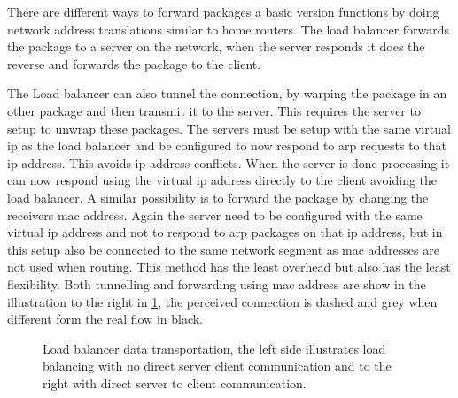 There are different ways to forward packages a basic version functions by doing network address translations similar to home routers.
The load balancer forwards the package to a server on the network, when the server responds it does the reverse and forwards the package to the client.

The Load balancer can also tunnel the connection, by warping the package in an other package and then transmit it to the server. This requires the server to setup to unwrap these packages. The servers must be setup with the same virtual ip as the load balancer and be configured to now respond to arp requests to that ip address. This avoids ip address conflicts. When the server is done processing it can now respond using the virtual ip address directly to the client avoiding the load balancer.
A similar possibility is to forward the package by changing the receivers mac address. Again the server need to be configured with the same virtual ip address and not to respond to arp packages on that ip address, but in this setup also be connected to the same network segment as mac addresses are not used when routing. This method has the least overhead but also has the least flexibility. Both tunnelling and forwarding using mac address are show in the illustration to the right in \cref{fig:LoadbalancerOperation}, the perceived connection is dashed and grey when different form the real flow in black.


\begin{figure}
	\centering
	\scalebox{0.7}{}
	\scalebox{0.7}{}
	\caption[Load balancer data transportation]{
		\label{fig:LoadbalancerOperation} 
		\footnotesize{%
			Load balancer data transportation, the left side illustrates load balancing with no direct server client communication and to the right with direct server to client communication.
		}
	}
\end{figure}


